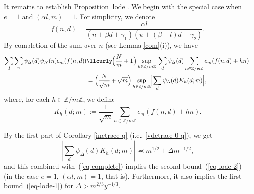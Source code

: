 \documentclass[12pt,a4paper,reqno]{amsart}
\numberwithin{equation}{section}
\theoremstyle{plain}
\theoremstyle{definition}
\newcommand\Z{\mathbb{Z}}
\newcommand\Zz{\mathbb{Z}}
\renewcommand{\lessapprox}{\llcurly}
\begin{document}
It remains to establish Proposition \ref{lode}.  We begin with the
special case when $e=1$ and $(\alpha l,m)=1$. For simplicity, we
denote
$$
f(n,d)=\frac{\alpha l}{(n+\beta d+\gamma_1)(n+(\beta+l)d+\gamma_2)}.
$$
By completion of the sum over $n$ (see Lemma \ref{com}(i)), we have
\begin{align}
  \sum_d \sum_n \psi_{\Delta}(d) \psi_N(n) e_m(f(n,d)) &\lessapprox
  \Bigl(\frac{N}{m}+1\Bigr) \sup_{h \in\Z/m\Z} \Bigl|\sum_d
  \psi_{\Delta}(d)\sum_{n \in \Z/m\Z} e_m(f(n,d)+hn)\Bigr|\nonumber
  \\
& = \Bigl(\frac{N}{\sqrt{m}}+\sqrt{m}\Bigr) \sup_{h
    \in\Z/m\Z} \Bigl|\sum_d \psi_{\Delta}(d)K_h(d;m)\Bigr|,\label{eq-complete}
\end{align}
where, for each $h\in \Z/m\Z$, we define
$$
K_h(d;m) := \frac{1}{\sqrt{m}} \sum_{n \in \Z/m\Z} e_m(f(n,d)+hn).
$$

By the first part of Corollary \ref{inctrace-q} (i.e., \eqref{vdctrace-0-q}), we get
\begin{equation}\label{light-toast}
  \left|\sum_d \psi_{\Delta}(d) K_h(d;m)\right| 
\lessapprox m^{1/2} + \Delta m^{-1/2},
\end{equation}
and this combined with~(\ref{eq-complete}) implies the second
bound~(\ref{eq-lode-2}) (in the case $e=1$, $(\alpha l,m)=1$, that is).  Furthermore,
it also implies the first bound~(\ref{eq-lode-1}) for
$\Delta>m^{2/3}y^{-1/3}$.
\end{document}

